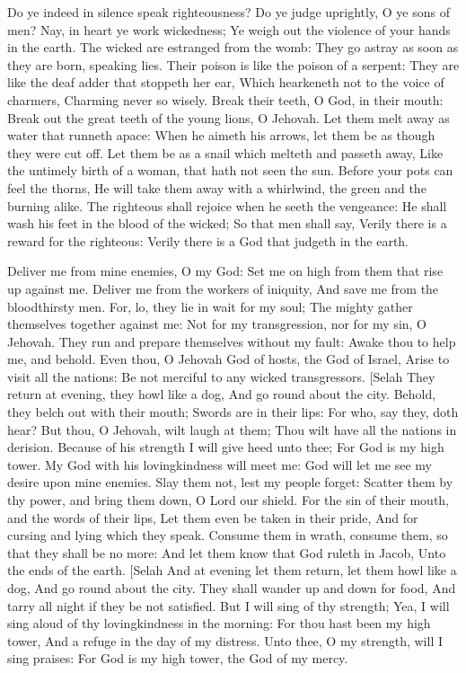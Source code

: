 Do ye indeed in silence speak righteousness? Do ye judge uprightly, O ye sons of men?  Nay, in heart ye work wickedness; Ye weigh out the violence of your hands in the earth.  The wicked are estranged from the womb: They go astray as soon as they are born, speaking lies.  Their poison is like the poison of a serpent: They are like the deaf adder that stoppeth her ear,  Which hearkeneth not to the voice of charmers, Charming never so wisely.  Break their teeth, O God, in their mouth: Break out the great teeth of the young lions, O Jehovah.  Let them melt away as water that runneth apace: When he aimeth his arrows, let them be as though they were cut off.  Let them be as a snail which melteth and passeth away, Like the untimely birth of a woman, that hath not seen the sun.  Before your pots can feel the thorns, He will take them away with a whirlwind, the green and the burning alike.  The righteous shall rejoice when he seeth the vengeance: He shall wash his feet in the blood of the wicked;  So that men shall say, Verily there is a reward for the righteous: Verily there is a God that judgeth in the earth. 

Deliver me from mine enemies, O my God: Set me on high from them that rise up against me.  Deliver me from the workers of iniquity, And save me from the bloodthirsty men.  For, lo, they lie in wait for my soul; The mighty gather themselves together against me: Not for my transgression, nor for my sin, O Jehovah.  They run and prepare themselves without my fault: Awake thou to help me, and behold.  Even thou, O Jehovah God of hosts, the God of Israel, Arise to visit all the nations: Be not merciful to any wicked transgressors. [Selah  They return at evening, they howl like a dog, And go round about the city.  Behold, they belch out with their mouth; Swords are in their lips: For who, say they, doth hear?  But thou, O Jehovah, wilt laugh at them; Thou wilt have all the nations in derision.  Because of his strength I will give heed unto thee; For God is my high tower.  My God with his lovingkindness will meet me: God will let me see my desire upon mine enemies.  Slay them not, lest my people forget: Scatter them by thy power, and bring them down, O Lord our shield.  For the sin of their mouth, and the words of their lips, Let them even be taken in their pride, And for cursing and lying which they speak.  Consume them in wrath, consume them, so that they shall be no more: And let them know that God ruleth in Jacob, Unto the ends of the earth. [Selah  And at evening let them return, let them howl like a dog, And go round about the city.  They shall wander up and down for food, And tarry all night if they be not satisfied.  But I will sing of thy strength; Yea, I will sing aloud of thy lovingkindness in the morning: For thou hast been my high tower, And a refuge in the day of my distress.  Unto thee, O my strength, will I sing praises: For God is my high tower, the God of my mercy. 

